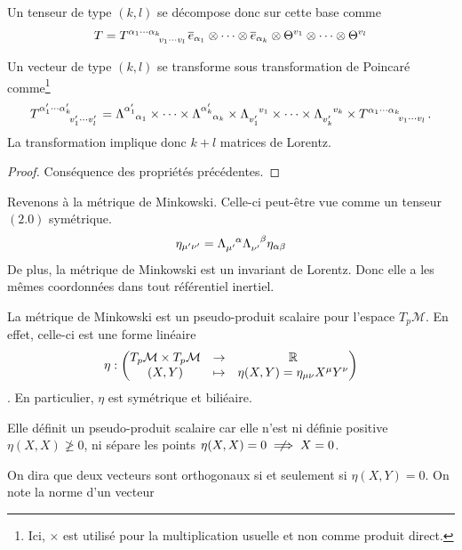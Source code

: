 Un tenseur de type $(k,l)$ se décompose donc sur cette base comme
\begin{equation}
    T = T\indices{^{\alpha _1 \cdots \alpha _k}_{v_1 \cdots v_l}}\overline{e}_{\alpha_1} \otimes \cdots \otimes \overline{e}_{\alpha_k} \otimes \Theta^{v _1}\otimes \cdots \otimes \Theta^{v _l}
\end{equation}
\begin{theoremframe}
    \begin{propri}
        Un vecteur de type $(k,l)$ se transforme sous transformation de Poincaré comme\footnote{Ici, $\times$ est utilisé pour la multiplication usuelle et non comme produit direct.}
        \begin{equation}
            T\indices{^{\alpha ' _1 \cdots \alpha ' _k}_{v'_1 \cdots v'_l}} = \Lambda\indices{^{\alpha '_1}_{\alpha _1 }} \times \cdots \times \Lambda\indices{^{\alpha '_k}_{\alpha _k}} \times \Lambda\indices{_{v'_1 }^{v_1 }} \times \cdots \times \Lambda\indices{_{v'_k}^{v_k}} \times T\indices{^{\alpha _1 \cdots \alpha _k}_{v_1 \cdots v_l}}.
        \end{equation}
        La transformation implique donc $k+l$ matrices de Lorentz.
    \end{propri}
\end{theoremframe}
\begin{proof}
    Conséquence des propriétés précédentes.
\end{proof}

Revenons à la métrique de Minkowski. Celle-ci peut-être vue comme un tenseur $(2.0)$ symétrique.
\begin{equation*}
    \eta_{\mu ' \nu '} = \Lambda\indices{_{\mu '}^{\alpha}}\Lambda\indices{_{\nu ' }^{\beta}}\eta_{\alpha \beta}
\end{equation*}
De plus, la métrique de Minkowski est un invariant de Lorentz. Donc elle a les mêmes coordonnées dans tout référentiel inertiel.

\begin{theoremframe}
    \begin{defi}
        La métrique de Minkowski est un pseudo-produit scalaire pour l'espace $T_p\mathcal{M}$. En effet, celle-ci est une forme linéaire 
        \begin{align}
        \eta:\begin{pmatrix}
             T_p\mathcal{M} \times T_p\mathcal{M} & \to & \mathbb{R}\\
            (X,Y) & \mapsto & \eta(X,Y) = \eta_{\mu  \nu }X^{\mu}Y^{\nu}
        \end{pmatrix}
        \end{align}.
        En particulier, $\eta$ est symétrique et biliéaire.
    \end{defi}
    
\end{theoremframe}
\begin{rmk}
    Elle définit un pseudo-produit scalaire car elle n'est ni définie positive $\eta(X,X) \ngeq 0$, ni sépare les points $\eta(X,X) = 0 \centernot \implies X = 0$.
\end{rmk}
On dira que deux vecteurs sont orthogonaux si et seulement si $\eta (X, Y) = 0$. On note la norme d'un vecteur

